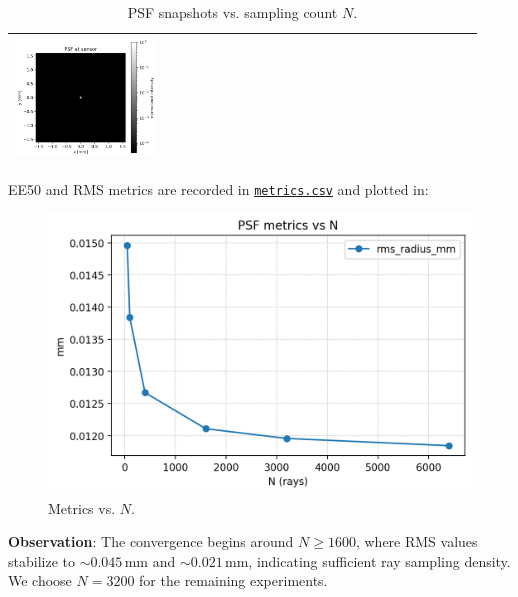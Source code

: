 \documentclass[11pt,a4paper]{article}
\begin{document}
\begin{table}[H]
\begin{tabular}{>{\centering\arraybackslash}m{0.31\linewidth} >{\centering\arraybackslash}m{0.31\linewidth} >{\centering\arraybackslash}m{0.31\linewidth}}
			\includegraphics[width=\linewidth,keepaspectratio]{sweep_N/biconvex_psf_3200_log.png} \\
			\bottomrule
		\end{tabular}
		\caption{PSF snapshots vs. sampling count \(N\).}
	\end{table}
	
	EE50 and RMS metrics are recorded in \href{../out/sweep_N/metrics.csv}{\texttt{metrics.csv}} and plotted in:
	\begin{figure}[H]
		\centering
		\includegraphics[width=\linewidth]{sweep_N/metrics_vs_N.png}
		\caption{Metrics vs. \(N\).}
	\end{figure}
	
	\textbf{Observation}: The convergence begins around \(N \ge 1600\), where RMS values stabilize to \(\sim 0.045\,\mathrm{mm}\) and \(\sim 0.021\,\mathrm{mm}\), indicating sufficient ray sampling density. We choose \(N=3200\) for the remaining experiments.
	
\end{document}
